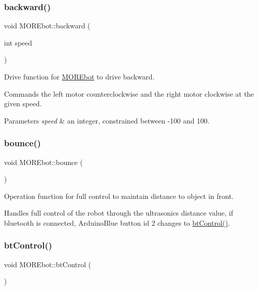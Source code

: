 \subsubsection{\texorpdfstring{backward()}{backward()}}
{\footnotesize\ttfamily void M\+O\+R\+Ebot\+::backward (\begin{DoxyParamCaption}\item[{int}]{speed }\end{DoxyParamCaption})}



Drive function for \mbox{\hyperlink{class_m_o_r_ebot}{M\+O\+R\+Ebot}} to drive backward. 

Commands the left motor counterclockwise and the right motor clockwise at the given speed. 
\begin{DoxyParams}{Parameters}
{\em speed} & an integer, constrained between -\/100 and 100. \\
\hline
\end{DoxyParams}
\mbox{\label{class_m_o_r_ebot_a2a685de71254397a986edaad9b22c8ef}} 
\subsubsection{\texorpdfstring{bounce()}{bounce()}}
{\footnotesize\ttfamily void M\+O\+R\+Ebot\+::bounce (\begin{DoxyParamCaption}{ }\end{DoxyParamCaption})}



Operation function for full control to maintain distance to object in front. 

Handles full control of the robot through the ultrasonic\textquotesingle{}s distance value, if bluetooth is connected, Arduino\+Blue button id 2 changes to \mbox{\hyperlink{class_m_o_r_ebot_a2d8d46314854b184b6808d799019c5bb}{bt\+Control()}}. \mbox{\label{class_m_o_r_ebot_a2d8d46314854b184b6808d799019c5bb}} 
\subsubsection{\texorpdfstring{btControl()}{btControl()}}
{\footnotesize\ttfamily void M\+O\+R\+Ebot\+::bt\+Control (\begin{DoxyParamCaption}{ }\end{DoxyParamCaption})}




